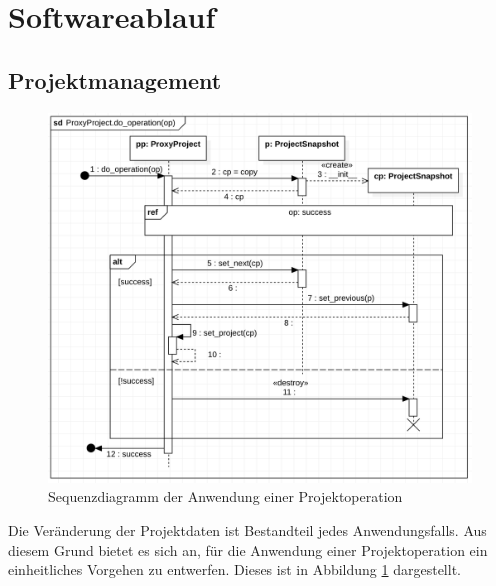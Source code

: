 \documentclass{article}
\begin{document}
\newpage
\section{Softwareablauf}
\subsection{Projektmanagement}
\begin{figure}[H]%
    \centering
    \includegraphics[width=13cm]{entwurf/Entwurf_dokument/img/Michael/sd_ProxyProject.do_operation.png}
    \caption{Sequenzdiagramm der Anwendung einer Projektoperation}
    \label{fig:sd:do_operation}
\end{figure}

Die Veränderung der Projektdaten ist Bestandteil jedes Anwendungsfalls. Aus diesem Grund bietet es sich an, für die Anwendung einer Projektoperation ein einheitliches Vorgehen zu entwerfen. Dieses ist in Abbildung \ref{fig:sd:do_operation} dargestellt.\\
\end{document}
